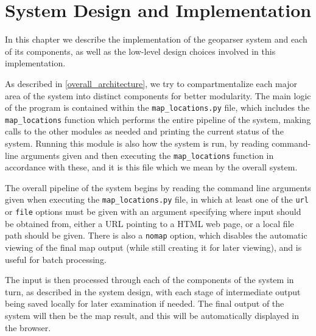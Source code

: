 \documentclass[12pt, a4paper]{report}
\begin{document}




\chapter{System Design and Implementation}

In this chapter we describe the implementation of the geoparser system and each of its components, as well as the low-level design choices involved in this implementation.

As described in \ref{overall_architecture}, we try to compartmentalize each major area of the system into distinct components for better modularity. The main logic of the program is contained within the \verb#map_locations.py# file, which includes the \verb#map_locations# function which performs the entire pipeline of the system, making calls to the other modules as needed and printing the current status of the system. Running this module is also how the system is run, by reading command-line arguments given and then executing the \verb#map_locations# function in accordance with these, and it is this file which we mean by the overall system.

The overall pipeline of the system begins by reading the command line arguments given when executing the \verb#map_locations.py# file, in which at least one of the \verb#url# or \verb#file# options must be given with an argument specifying where input should be obtained from, either a URL pointing to a HTML web page, or a local file path should be given. There is also a \verb#nomap# option, which disables the automatic viewing of the final map output (while still creating it for later viewing), and is useful for batch processing.

The input is then processed through each of the components of the system in turn, as described in the system design, with each stage of intermediate output being saved locally for later examination if needed. The final output of the system will then be the map result, and this will be automatically displayed in the browser.
\end{document}
